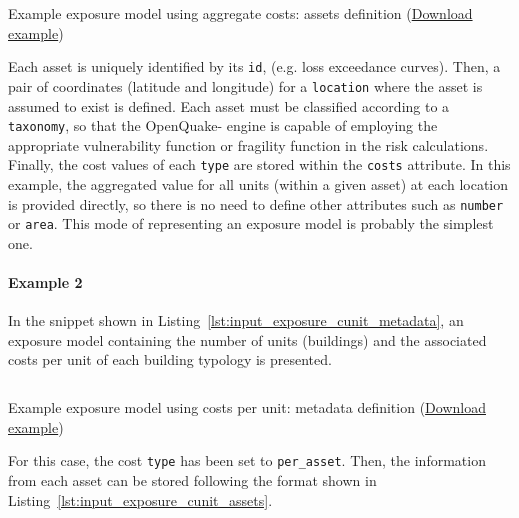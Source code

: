 \begin{listing}[htbp]
  \inputminted[firstline=19,firstnumber=19,lastline=29,fontsize=\footnotesize,frame=single,linenos,bgcolor=lightgray]{xml}{oqum/risk/Verbatim/input_exposure_cagg.xml}
  \caption{Example exposure model using aggregate costs: assets definition (\href{https://raw.githubusercontent.com/GEMScienceTools/oq-engine-docs/master/oqum/risk/verbatim/input_exposure_cagg.xml}{Download example})}
  \label{lst:input_exposure_cagg_assets}
\end{listing}

Each \gls{asset} is uniquely identified by its \Verb+id+, (e.g. loss
exceedance curves). Then, a pair of coordinates (latitude and longitude) for a
\Verb+location+ where the asset is assumed to exist is defined. Each asset
must be classified according to a \Verb+taxonomy+, so that the OpenQuake-
engine is capable of employing the appropriate \gls{vulnerability function} or
\gls{fragility function} in the risk calculations. Finally, the cost values of
each \Verb+type+ are stored within the \Verb+costs+ attribute. In this
example, the aggregated value for all units (within a given asset) at each
location is provided directly, so there is no need to define other attributes
such as \Verb+number+ or \Verb+area+. This mode of representing an exposure
model is probably the simplest one.


\paragraph{Example 2}

In the snippet shown in Listing~\ref{lst:input_exposure_cunit_metadata}, an
\gls{exposure model} containing the number of units (buildings) and the
associated costs per unit of each building typology is presented.

\begin{listing}[htbp]
  \inputminted[firstline=8,firstnumber=8,lastline=18,fontsize=\footnotesize,frame=single,linenos,bgcolor=lightgray]{xml}{oqum/risk/Verbatim/input_exposure_cunit.xml}
  \caption{Example exposure model using costs per unit: metadata definition (\href{https://raw.githubusercontent.com/GEMScienceTools/oq-engine-docs/master/oqum/risk/verbatim/input_exposure_cunit.xml}{Download example})}
  \label{lst:input_exposure_cunit_metadata}
\end{listing}

For this case, the cost \Verb+type+ has been set to \Verb+per_asset+. Then,
the information from each asset can be stored following the format shown in
Listing~\ref{lst:input_exposure_cunit_assets}.

